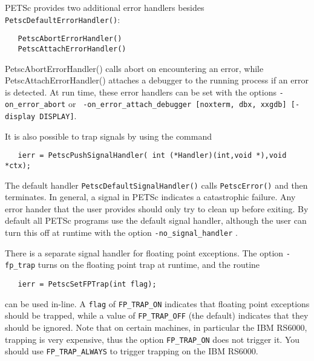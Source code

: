PETSc provides two additional error handlers besides 
{\tt PetscDefaultErrorHandler()}:
 
\begin{verbatim}
   PetscAbortErrorHandler()
   PetscAttachErrorHandler()
\end{verbatim}
PetscAbortErrorHandler() calls abort on encountering an error, while
PetscAttachErrorHandler() attaches a debugger to the running process
if an error is detected. At run time, these error handlers can be set
with the options {\tt -on\_error\_abort} or {\tt
-on\_error\_attach\_debugger [noxterm, dbx, xxgdb] [-display DISPLAY]}.

It is also possible to trap signals by using the 
command 
\begin{verbatim}
   ierr = PetscPushSignalHandler( int (*Handler)(int,void *),void *ctx);
\end{verbatim}
The default handler {\tt PetscDefaultSignalHandler()} 
calls  
{\tt PetscError()} and then terminates. In general, a signal in PETSc
indicates a catastrophic failure.  Any error hander that the user provides
should only try to clean up before exiting.  By default all PETSc programs
use the default signal handler, although the user can turn this off 
at runtime with the 
option {\tt -no\_signal\_handler} .

There is a separate signal handler for floating point
  exceptions.  
The option {\tt -fp\_trap} turns on the floating point trap at runtime,
and the routine   
\begin{verbatim}
   ierr = PetscSetFPTrap(int flag);
\end{verbatim}
can be used in-line.
A {\tt flag} of {\tt FP\_TRAP\_ON} 
indicates that floating point exceptions should be trapped,
while a value of {\tt FP\_TRAP\_OFF} (the default) indicates that they 
should be ignored.  Note that on certain machines, in particular 
the IBM RS6000, trapping is very expensive, thus the option 
{\tt FP\_TRAP\_ON} does not trigger it. You should use 
{\tt FP\_TRAP\_ALWAYS} to trigger trapping on the IBM RS6000. 

